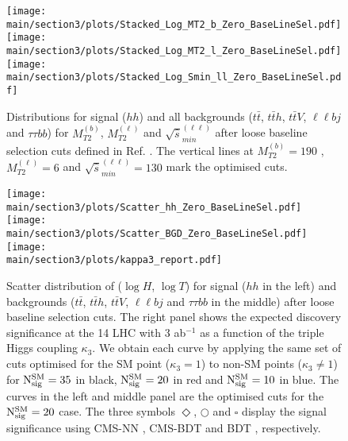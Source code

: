 %
\begin{figure*}[t]
\centering
\texttt{[image: \\main/section3/plots/Stacked\_Log\_MT2\_b\_Zero\_BaseLineSel.pdf]} \hspace*{-0.65cm}
\texttt{[image: \\main/section3/plots/Stacked\_Log\_MT2\_l\_Zero\_BaseLineSel.pdf]}   \hspace*{-0.65cm}
\texttt{[image: \\main/section3/plots/Stacked\_Log\_Smin\_ll\_Zero\_BaseLineSel.pdf]} 
\caption{\label{fig:newcuts} 
Distributions for signal ($hh$) and all backgrounds ($t \bar t$, $t\bar t h$, $t \bar t V$, $\ell\ell b j$ and $\tau\tau b b$) for $M_{T2}^{(b)}$, $M_{T2}^{(\ell)}$ and $\sqrt{\hat{s}}_{min}^{(\ell\ell)}$ after loose baseline selection cuts defined in Ref. \cite{Kim:2018cxf}. 
The vertical lines at $M_{T2}^{(b)} = 190$ \UGeV, $M_{T2}^{(\ell)}= 6$ \UGeV and $\sqrt{\hat{s}}_{min}^{(\ell\ell)}=130$ \UGeV mark the optimised cuts.}
\end{figure*}
%
%
%
\begin{figure}[t]
\centering
\texttt{[image: \\main/section3/plots/Scatter\_hh\_Zero\_BaseLineSel.pdf]}   \hspace*{-0.525cm}
\texttt{[image: \\main/section3/plots/Scatter\_BGD\_Zero\_BaseLineSel.pdf]} \hspace*{-0.1cm}
\texttt{[image: \\main/section3/plots/kappa3\_report.pdf]} 
\caption{\label{fig:scatter} 
Scatter distribution of ($\log H$, $\log T$) for signal ($hh$ in the left) and backgrounds ($t \bar t$, $t\bar t h$, $t \bar t V$, $\ell\ell b j$ and $\tau\tau b b$ in the middle) after loose baseline selection cuts.
The right panel shows the expected discovery significance at the 14 \UTeV LHC with 3 ab$^{-1}$ as a function of the triple Higgs coupling $\kappa_3$.
We obtain each curve by applying the same set of cuts optimised for the SM point ($\kappa_3=1$) to non-SM points ($\kappa_3 \neq 1$) for ${\rm N_{sig}^{SM}}=35$ in black, ${\rm N_{sig}^{SM}}=20$ in red and ${\rm N_{sig}^{SM}}=10$ in blue.
The curves in the left and middle panel are the optimised cuts for the ${\rm N_{sig}^{SM}}=20$ case.
The three symbols {\color{red}$\Diamond$}, {\color{black}$\bigcirc$} and {\color{blue}$\square$} display the signal significance 
using CMS-NN \cite{CMS:2015nat}, CMS-BDT \cite{CMS:2017cwx} and BDT \cite{Adhikary:2017jtu}, respectively.
}
\end{figure}
%

